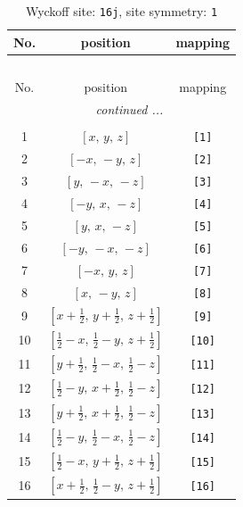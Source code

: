 \documentclass[fleqn,8pt]{jsarticle}
\begin{document}
\begin{longtable}{ccc}
\caption{Wyckoff site: {\tt 16j}, site symmetry: {\tt 1}}
 \\
 \hline \hline
No. & position & mapping \\ \hline \endfirsthead

\multicolumn{2}{l}{\tablename\ \thetable{}} \\
 \hline \hline
No. & position & mapping \\ \hline \endhead

 \hline \hline
\multicolumn{2}{r}{\footnotesize\it continued ...} \\ \endfoot

 \hline \hline
\multicolumn{2}{r}{} \\ \endlastfoot

1 & $\left[ x,\, y,\, z \right]$ & {\tt [1]} \\ \hline
2 & $\left[ - x,\, - y,\, z \right]$ & {\tt [2]} \\ \hline
3 & $\left[ y,\, - x,\, - z \right]$ & {\tt [3]} \\ \hline
4 & $\left[ - y,\, x,\, - z \right]$ & {\tt [4]} \\ \hline
5 & $\left[ y,\, x,\, - z \right]$ & {\tt [5]} \\ \hline
6 & $\left[ - y,\, - x,\, - z \right]$ & {\tt [6]} \\ \hline
7 & $\left[ - x,\, y,\, z \right]$ & {\tt [7]} \\ \hline
8 & $\left[ x,\, - y,\, z \right]$ & {\tt [8]} \\ \hline
9 & $\left[ x + \frac{1}{2},\, y + \frac{1}{2},\, z + \frac{1}{2} \right]$ & {\tt [9]} \\ \hline
10 & $\left[ \frac{1}{2} - x,\, \frac{1}{2} - y,\, z + \frac{1}{2} \right]$ & {\tt [10]} \\ \hline
11 & $\left[ y + \frac{1}{2},\, \frac{1}{2} - x,\, \frac{1}{2} - z \right]$ & {\tt [11]} \\ \hline
12 & $\left[ \frac{1}{2} - y,\, x + \frac{1}{2},\, \frac{1}{2} - z \right]$ & {\tt [12]} \\ \hline
13 & $\left[ y + \frac{1}{2},\, x + \frac{1}{2},\, \frac{1}{2} - z \right]$ & {\tt [13]} \\ \hline
14 & $\left[ \frac{1}{2} - y,\, \frac{1}{2} - x,\, \frac{1}{2} - z \right]$ & {\tt [14]} \\ \hline
15 & $\left[ \frac{1}{2} - x,\, y + \frac{1}{2},\, z + \frac{1}{2} \right]$ & {\tt [15]} \\ \hline
16 & $\left[ x + \frac{1}{2},\, \frac{1}{2} - y,\, z + \frac{1}{2} \right]$ & {\tt [16]} \\
\end{longtable}
\end{document}
